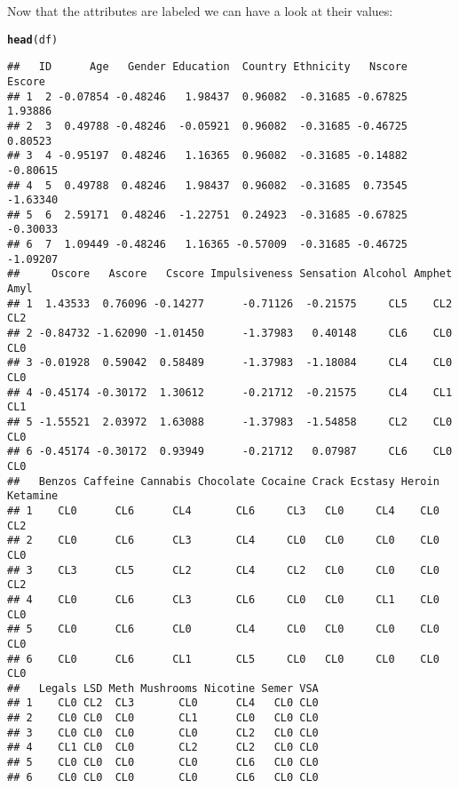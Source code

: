 \documentclass{article}\usepackage[]{graphicx}\usepackage[]{color}
\makeatletter
\newcommand{\hlstd}[1]{\textcolor[rgb]{0.345,0.345,0.345}{#1}}%
\newcommand{\hlkwd}[1]{\textcolor[rgb]{0.737,0.353,0.396}{\textbf{#1}}}%
\newenvironment{kframe}{%
 \def\at@end@of@kframe{}%
 \ifinner\ifhmode%
  \def\at@end@of@kframe{\end{minipage}}%
  \begin{minipage}{\columnwidth}%
 \fi\fi%
 \def\FrameCommand##1{\hskip\@totalleftmargin \hskip-\fboxsep
 \colorbox{shadecolor}{##1}\hskip-\fboxsep
     \hskip-\linewidth \hskip-\@totalleftmargin \hskip\columnwidth}%
 \MakeFramed {\advance\hsize-\width
   \@totalleftmargin\z@ \linewidth\hsize
   \@setminipage}}%
 {\par\unskip\endMakeFramed%
 \at@end@of@kframe}
\newenvironment{knitrout}{}{} %
\makeatother
\begin{document}
Now that the attributes are labeled we can have a look at their values:
\begin{knitrout}
\color{fgcolor}\begin{kframe}
\begin{alltt}
\hlkwd{head}\hlstd{(df)}
\end{alltt}
\begin{verbatim}
##   ID      Age   Gender Education  Country Ethnicity   Nscore   Escore
## 1  2 -0.07854 -0.48246   1.98437  0.96082  -0.31685 -0.67825  1.93886
## 2  3  0.49788 -0.48246  -0.05921  0.96082  -0.31685 -0.46725  0.80523
## 3  4 -0.95197  0.48246   1.16365  0.96082  -0.31685 -0.14882 -0.80615
## 4  5  0.49788  0.48246   1.98437  0.96082  -0.31685  0.73545 -1.63340
## 5  6  2.59171  0.48246  -1.22751  0.24923  -0.31685 -0.67825 -0.30033
## 6  7  1.09449 -0.48246   1.16365 -0.57009  -0.31685 -0.46725 -1.09207
##     Oscore   Ascore   Cscore Impulsiveness Sensation Alcohol Amphet Amyl
## 1  1.43533  0.76096 -0.14277      -0.71126  -0.21575     CL5    CL2  CL2
## 2 -0.84732 -1.62090 -1.01450      -1.37983   0.40148     CL6    CL0  CL0
## 3 -0.01928  0.59042  0.58489      -1.37983  -1.18084     CL4    CL0  CL0
## 4 -0.45174 -0.30172  1.30612      -0.21712  -0.21575     CL4    CL1  CL1
## 5 -1.55521  2.03972  1.63088      -1.37983  -1.54858     CL2    CL0  CL0
## 6 -0.45174 -0.30172  0.93949      -0.21712   0.07987     CL6    CL0  CL0
##   Benzos Caffeine Cannabis Chocolate Cocaine Crack Ecstasy Heroin Ketamine
## 1    CL0      CL6      CL4       CL6     CL3   CL0     CL4    CL0      CL2
## 2    CL0      CL6      CL3       CL4     CL0   CL0     CL0    CL0      CL0
## 3    CL3      CL5      CL2       CL4     CL2   CL0     CL0    CL0      CL2
## 4    CL0      CL6      CL3       CL6     CL0   CL0     CL1    CL0      CL0
## 5    CL0      CL6      CL0       CL4     CL0   CL0     CL0    CL0      CL0
## 6    CL0      CL6      CL1       CL5     CL0   CL0     CL0    CL0      CL0
##   Legals LSD Meth Mushrooms Nicotine Semer VSA
## 1    CL0 CL2  CL3       CL0      CL4   CL0 CL0
## 2    CL0 CL0  CL0       CL1      CL0   CL0 CL0
## 3    CL0 CL0  CL0       CL0      CL2   CL0 CL0
## 4    CL1 CL0  CL0       CL2      CL2   CL0 CL0
## 5    CL0 CL0  CL0       CL0      CL6   CL0 CL0
## 6    CL0 CL0  CL0       CL0      CL6   CL0 CL0
\end{verbatim}
\end{kframe}
\end{knitrout}
\end{document}
